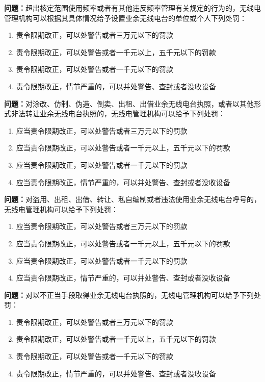 \bigskip


\noindent\textbf{问题：}超出核定范围使用频率或者有其他违反频率管理有关规定的行为的，无线电管理机构可以根据其具体情况给予设置业余无线电台的单位或个人下列处罚：
\begin{enumerate}[label=\Alph*), leftmargin=3em]
\item 责令限期改正，可以处警告或者三万元以下的罚款
\item 责令限期改正，可以处警告或者一千元以上，五千元以下的罚款
\item 责令限期改正，可以处警告或者一千元以下的罚款
\item 责令限期改正，情节严重的，可以并处警告、查封或者没收设备
\end{enumerate}

\bigskip


\noindent\textbf{问题：}对涂改、仿制、伪造、倒卖、出租、出借业余无线电台执照，或者以其他形式非法转让业余无线电台执照的，无线电管理机构可以给予下列处罚：
\begin{enumerate}[label=\Alph*), leftmargin=3em]
\item 应当责令限期改正，可以处警告或者三万元以下的罚款
\item 应当责令限期改正，可以处警告或者一千元以上，五千元以下的罚款
\item 应当责令限期改正，可以处警告或者一千元以下的罚款
\item 应当责令限期改正，情节严重的，可以并处警告、查封或者没收设备
\end{enumerate}

\bigskip


\noindent\textbf{问题：}对盗用、出租、出借、转让、私自编制或者违法使用业余无线电台呼号的，无线电管理机构可以给予下列处罚：
\begin{enumerate}[label=\Alph*), leftmargin=3em]
\item 应当责令限期改正，可以处警告或者三万元以下的罚款
\item 应当责令限期改正，可以处警告或者一千元以上，五千元以下的罚款
\item 应当责令限期改正，可以处警告或者一千元以下的罚款
\item 应当责令限期改正，情节严重的，可以并处警告、查封或者没收设备
\end{enumerate}

\bigskip


\noindent\textbf{问题：}对以不正当手段取得业余无线电台执照的，无线电管理机构可以给予下列处罚：
\begin{enumerate}[label=\Alph*), leftmargin=3em]
\item 责令限期改正，可以处警告或者三万元以下的罚款
\item 责令限期改正，可以处警告或者一千元以上，五千元以下的罚款
\item 责令限期改正，可以处警告或者一千元以下的罚款
\item 责令限期改正，情节严重的，可以并处警告、查封或者没收设备
\end{enumerate}

